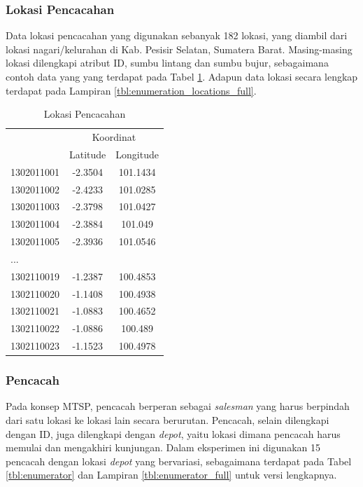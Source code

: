 \subsubsection{Lokasi Pencacahan}
Data lokasi pencacahan yang digunakan sebanyak 182 lokasi, yang diambil dari lokasi nagari/kelurahan di Kab. Pesisir Selatan, Sumatera Barat. Masing-masing lokasi dilengkapi atribut ID, sumbu lintang dan sumbu bujur, sebagaimana contoh data yang yang terdapat pada Tabel \ref{tbl:enumeration_locations}. Adapun data lokasi secara lengkap terdapat pada Lampiran \ref{tbl:enumeration_locations_full}.


\begin{table}[!]
	\centering
	\caption{Lokasi Pencacahan}
	\label{tbl:enumeration_locations}
	\begin{tabular}{lcc}
		\toprule
			& \multicolumn{2}{c}{Koordinat}\\
		\cmidrule{2-3}
			& Latitude & Longitude\\ 
		\midrule
			1302011001 & -2.3504 & 101.1434\\ 
			1302011002 & -2.4233 & 101.0285\\ 
			1302011003 & -2.3798 & 101.0427\\ 
			1302011004 & -2.3884 & 101.049\\ 
			1302011005 & -2.3936 & 101.0546\\
			...\\
			1302110019 & -1.2387 & 100.4853\\ 
			1302110020 & -1.1408 & 100.4938\\ 
			1302110021 & -1.0883 & 100.4652\\ 
			1302110022 & -1.0886 & 100.489\\ 
			1302110023 & -1.1523 & 100.4978\\
		\bottomrule
	\end{tabular}
\end{table}


\subsubsection{Pencacah}
Pada konsep MTSP, pencacah berperan sebagai \textit{salesman} yang harus berpindah dari satu lokasi ke lokasi lain secara berurutan. Pencacah, selain dilengkapi dengan ID, juga dilengkapi dengan \textit{depot}, yaitu lokasi dimana pencacah harus memulai dan mengakhiri kunjungan. Dalam eksperimen ini digunakan 15 pencacah dengan lokasi \textit{depot} yang bervariasi, sebagaimana terdapat pada Tabel \ref{tbl:enumerator} dan Lampiran \ref{tbl:enumerator_full} untuk versi lengkapnya.


